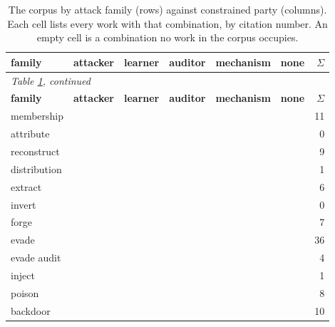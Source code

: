 \begin{landscape}
\begingroup\scriptsize\setlength{\tabcolsep}{3pt}
\begin{longtable}{lp{3.10cm}p{3.10cm}p{3.10cm}p{3.10cm}p{3.10cm}r}
\caption{The corpus by attack family (rows) against constrained party (columns). Each cell lists every work with that combination, by citation number. An empty cell is a combination no work in the corpus occupies.}\label{tab:family-party}\\
\toprule \textbf{family} & \textbf{attacker} & \textbf{learner} & \textbf{auditor} & \textbf{mechanism} & \textbf{none} & \textbf{$\Sigma$} \\ \midrule\endfirsthead
\multicolumn{7}{l}{\emph{Table \ref{tab:family-party}, continued}}\\
\toprule \textbf{family} & \textbf{attacker} & \textbf{learner} & \textbf{auditor} & \textbf{mechanism} & \textbf{none} & \textbf{$\Sigma$} \\ \midrule\endhead
\bottomrule\endfoot
membership & \cite{CCNSTT22,HSU25,SSSS17,VDKMR26} &  & \cite{ZDKT25} &  & \cite{AZT24,DSMMSZTCEH24,DZT25,MSJFRM25,RL21,YGFJ18} & 11 \\
attribute &  &  &  &  &  & 0 \\
reconstruct & \cite{BDJV22,CKMMNST24,DN03,HU14,ML24} &  &  &  & \cite{BCH22,CHSS24,KMNS25,WLBZ25} & 9 \\
distribution & \cite{XSD24} &  &  &  &  & 1 \\
extract & \cite{CCGJY19,CCHRSS24,CJM20,DKLP22,JCBKP20} &  &  &  & \cite{SSEP24} & 6 \\
invert &  &  &  &  &  & 0 \\
forge & \cite{DJYWWMNL26,DQW22,FJTYCDCP23,JYCDTCP21,ZFWCSXZ26} &  &  &  & \cite{KCC23,TJSP22} & 7 \\
evade & \cite{ACW18,CAPBRTGMK19,CASDFCMH21,CGBSHC22,CRK19,CYDS26,DMM19,EMM20,FFF18,FK24,GJMM20,GMFSRWG18,HDDH25,LAGHJ19,MDM19,MZME19,Mah19,PSV23,SLDLN25,SSTTM18,SSZHTE24,SWKBC25,SYLZZRB19,TCBM20,TSETM19,WK18} & \cite{AH23,BLPR18,BPR19,CBM18,DNV19,MHS19,MHS22} & \cite{BGGKRR25} &  & \cite{FTHMLD25,GCSGWVBHMB25} & 36 \\
evade audit & \cite{ZCSL24} &  & \cite{NK26} &  & \cite{RCA24,Sha23} & 4 \\
inject &  &  & \cite{ZYWGW25} &  &  & 1 \\
poison & \cite{LCMER25,LXSWLGZX25,MMM19,SKL17} & \cite{BBHS22,DIKR25,DKKLMS16,WZDD24} &  &  &  & 8 \\
backdoor & \cite{NCM25,RT23} &  & \cite{CHLX25,DGMRLW24,GKVZ22,GSVV25,KKOSVZ24} &  & \cite{AKKTARXLNP25,QMZAKFG22,VG20} & 10 \\

\end{longtable}
\end{landscape}

